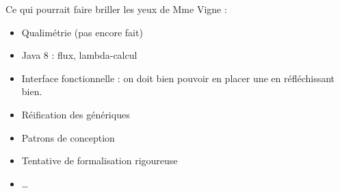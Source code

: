 \documentclass[11pt]{article}
\begin{document}
Ce qui pourrait faire briller les yeux de Mme Vigne :
\begin{itemize}
\item Qualimétrie (pas encore fait)
\item Java 8 : flux, lambda-calcul
\item Interface fonctionnelle : on doit bien pouvoir en placer une en réfléchissant bien.
\item Réification des génériques
\item Patrons de conception
\item Tentative de formalisation rigoureuse
\item \dots
\end{itemize}
\end{document}
